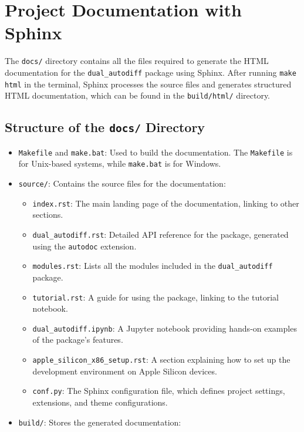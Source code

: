 \documentclass[a4paper,12pt]{article}
\begin{document}
\section{Project Documentation with Sphinx}

The \texttt{docs/} directory contains all the files required to generate the HTML documentation for the \texttt{dual\_autodiff} package using Sphinx. After running \texttt{make html} in the terminal, Sphinx processes the source files and generates structured HTML documentation, which can be found in the \texttt{build/html/} directory.

\subsection{Structure of the \texttt{docs/} Directory}
\begin{itemize}
    \item \texttt{Makefile} and \texttt{make.bat}: Used to build the documentation. The \texttt{Makefile} is for Unix-based systems, while \texttt{make.bat} is for Windows.
    \item \texttt{source/}: Contains the source files for the documentation:
    \begin{itemize}
        \item \texttt{index.rst}: The main landing page of the documentation, linking to other sections.
        \item \texttt{dual\_autodiff.rst}: Detailed API reference for the package, generated using the \texttt{autodoc} extension.
        \item \texttt{modules.rst}: Lists all the modules included in the \texttt{dual\_autodiff} package.
        \item \texttt{tutorial.rst}: A guide for using the package, linking to the tutorial notebook.
        \item \texttt{dual\_autodiff.ipynb}: A Jupyter notebook providing hands-on examples of the package's features.
        \item \texttt{apple\_silicon\_x86\_setup.rst}: A section explaining how to set up the development environment on Apple Silicon devices.
        \item \texttt{conf.py}: The Sphinx configuration file, which defines project settings, extensions, and theme configurations.
    \end{itemize}
    \item \texttt{build/}: Stores the generated documentation:
    \begin{itemize}

\end{itemize}
\end{itemize}
\end{document}
